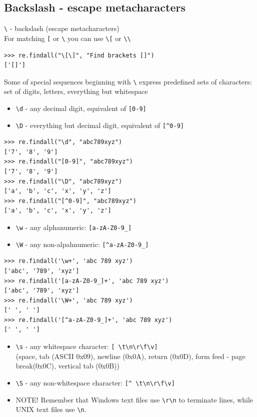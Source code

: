 \documentclass{beamer}
\begin{document}
\subsection{Backslash - escape metacharacters}
\begin{frame}[fragile]
\verb/\/ - backslash (escape metacharacters) \\
For matching \verb/[/ or \verb/\/ you can use \verb/\[/ or \verb/\\/ \\
\begin{lstlisting}
>>> re.findall("\[\]", "Find brackets []")
['[]']
\end{lstlisting}
\pause
Some of special sequences beginning with \verb/\/ express predefined sets of characters: set of digits, letters, everything but whitespace
\end{frame}

\begin{frame}[fragile]
\begin{itemize}
\item \verb/\d/ - any decimal digit, equivalent of \verb/[0-9]/
\item \verb/\D/ - everything but decimal digit, equivalent of \verb/[^0-9]/
\end{itemize}
\begin{lstlisting}
>>> re.findall("\d", "abc789xyz")
['7', '8', '9']
>>> re.findall("[0-9]", "abc789xyz")
['7', '8', '9']
>>> re.findall("\D", "abc789xyz")
['a', 'b', 'c', 'x', 'y', 'z']
>>> re.findall("[^0-9]", "abc789xyz")
['a', 'b', 'c', 'x', 'y', 'z']
\end{lstlisting}
\end{frame}

\begin{frame}[fragile]
\begin{itemize}
\item \verb/\w/ - any alphanumeric: \verb/[a-zA-Z0-9_]/
\item \verb/\W/ - any non-alpahnumeric: \verb/[^a-zA-Z0-9_]/
\end{itemize}
\begin{lstlisting}
>>> re.findall('\w+', 'abc 789 xyz')
['abc', '789', 'xyz']
>>> re.findall('[a-zA-Z0-9_]+', 'abc 789 xyz')
['abc', '789', 'xyz']
>>> re.findall('\W+', 'abc 789 xyz')
[' ', ' ']
>>> re.findall('[^a-zA-Z0-9_]+', 'abc 789 xyz')
[' ', ' ']
\end{lstlisting}
\end{frame}

\begin{frame}[fragile]
\begin{itemize}
\item \verb/\s/ - any whitespace character: \verb/[ \t\n\r\f\v]/ \\ (space, tab (ASCII 0x09), newline (0x0A), return (0x0D), form feed - page break(0x0C), vertical tab (0x0B))
\item \verb/\S/ - any non-whitespace character: \verb/[^ \t\n\r\f\v]/
\pause
\item NOTE! Remember that Windows text files use \verb/\r\n/ to terminate lines, while UNIX text files use \verb/\n/.
\end{itemize}
\end{frame}
\end{document}
